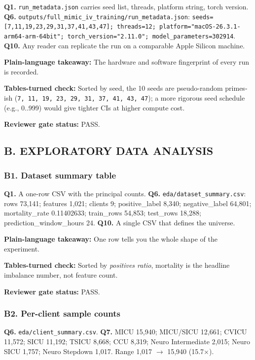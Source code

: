 \documentclass{article}
\begin{document}
\textbf{Q1.} \texttt{run\_metadata.json} carries seed list, threads, platform string, torch version. \textbf{Q6.} \texttt{outputs/full\_mimic\_iv\_training/run\_metadata.json}: \texttt{seeds=[7,11,19,23,29,31,37,41,43,47]; threads=12; platform="macOS-26.3.1-arm64-arm-64bit"; torch\_version="2.11.0"; model\_parameters=302914}. \textbf{Q10.} Any reader can replicate the run on a comparable Apple Silicon machine.


\textbf{Plain-language takeaway:} The hardware and software fingerprint of every run is recorded.


\textbf{Tables-turned check:} Sorted by seed, the 10 seeds are pseudo-random primes-ish (\texttt{7, 11, 19, 23, 29, 31, 37, 41, 43, 47}); a more rigorous seed schedule (e.g., 0..999) would give tighter CIs at higher compute cost.


\textbf{Reviewer gate status:} PASS.


\subsection{B. EXPLORATORY DATA ANALYSIS}


\subsubsection{B1. Dataset summary table}


\textbf{Q1.} A one-row CSV with the principal counts. \textbf{Q6.} \texttt{eda/dataset\_summary.csv}: rows 73,141; features 1,021; clients 9; positive\_label 8,340; negative\_label 64,801; mortality\_rate 0.11402633; train\_rows 54,853; test\_rows 18,288; prediction\_window\_hours 24. \textbf{Q10.} A single CSV that defines the universe.


\textbf{Plain-language takeaway:} One row tells you the whole shape of the experiment.


\textbf{Tables-turned check:} Sorted by \emph{positives ratio}, mortality is the headline imbalance number, not feature count.


\textbf{Reviewer gate status:} PASS.


\subsubsection{B2. Per-client sample counts}


\textbf{Q6.} \texttt{eda/client\_summary.csv}. \textbf{Q7.} MICU 15,940; MICU/SICU 12,661; CVICU 11,572; SICU 11,192; TSICU 8,668; CCU 8,319; Neuro Intermediate 2,015; Neuro SICU 1,757; Neuro Stepdown 1,017. Range 1,017 \ensuremath{\rightarrow} 15,940 (15.7\ensuremath{\times}).
\end{document}
